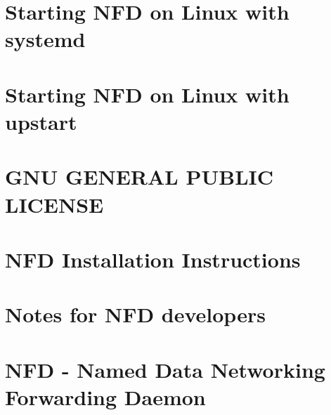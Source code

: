 \documentclass[twoside]{book}
\newcommand{\+}{\discretionary{\mbox{\scriptsize$\hookleftarrow$}}{}{}}
\begin{document}
\chapter{Starting N\+FD on Linux with systemd}
\label{md__home_network_NSOL_ndnSIM-dev_ns-3_src_ndnSIM_NFD_contrib_systemd_README}
\hypertarget{md__home_network_NSOL_ndnSIM-dev_ns-3_src_ndnSIM_NFD_contrib_systemd_README}{}

\chapter{Starting N\+FD on Linux with upstart}
\label{md__home_network_NSOL_ndnSIM-dev_ns-3_src_ndnSIM_NFD_contrib_upstart_README}
\hypertarget{md__home_network_NSOL_ndnSIM-dev_ns-3_src_ndnSIM_NFD_contrib_upstart_README}{}

\chapter{G\+NU G\+E\+N\+E\+R\+AL P\+U\+B\+L\+IC L\+I\+C\+E\+N\+SE}
\label{md__home_network_NSOL_ndnSIM-dev_ns-3_src_ndnSIM_NFD_COPYING}
\hypertarget{md__home_network_NSOL_ndnSIM-dev_ns-3_src_ndnSIM_NFD_COPYING}{}

\chapter{N\+FD Installation Instructions}
\label{md__home_network_NSOL_ndnSIM-dev_ns-3_src_ndnSIM_NFD_INSTALL}
\hypertarget{md__home_network_NSOL_ndnSIM-dev_ns-3_src_ndnSIM_NFD_INSTALL}{}

\chapter{Notes for N\+FD developers}
\label{md__home_network_NSOL_ndnSIM-dev_ns-3_src_ndnSIM_NFD_README-dev}
\hypertarget{md__home_network_NSOL_ndnSIM-dev_ns-3_src_ndnSIM_NFD_README-dev}{}

\chapter{N\+FD -\/ Named Data Networking Forwarding Daemon}
\label{md__home_network_NSOL_ndnSIM-dev_ns-3_src_ndnSIM_NFD_README}
\hypertarget{md__home_network_NSOL_ndnSIM-dev_ns-3_src_ndnSIM_NFD_README}{}

\end{document}

